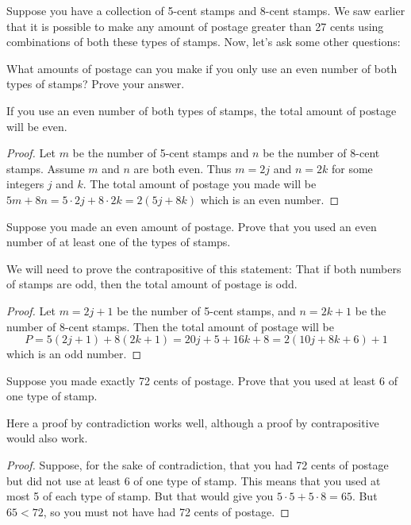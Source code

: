 \documentclass[11pt]{exam}
\begin{document}
Suppose you have a collection of 5-cent stamps and 8-cent stamps.  We saw earlier that it is possible to make any amount of postage greater than 27 cents using combinations of both these types of stamps.  Now, let's ask some other questions:
\begin{questions}
\question What amounts of postage can you make if you only use an even number of both types of stamps? Prove your answer.
\begin{solution}
If you use an even number of both types of stamps, the total amount of postage will be even.
\begin{proof}
Let $m$ be the number of 5-cent stamps and $n$ be the number of $8$-cent stamps.  Assume $m$ and $n$ are both even.  Thus $m = 2j$ and $n = 2k$ for some integers $j$ and $k$.  The total amount of postage you made will be $5m + 8n = 5\cdot 2j + 8\cdot 2k = 2(5j+8k)$ which is an even number.
\end{proof}
\end{solution}
\vfill
\question Suppose you made an even amount of postage.  Prove that you used an even number of at least one of the types of stamps.
\begin{solution}
We will need to prove the contrapositive of this statement: That if both numbers of stamps are odd, then the total amount of postage is odd.
\begin{proof}
Let $m = 2j+1$ be the number of 5-cent stamps, and $n = 2k+1$ be the number of 8-cent stamps.  Then the total amount of postage will be
\[P = 5(2j+1) + 8(2k+1) = 20j + 5 + 16k + 8 = 2(10j+8k+6) + 1\]
which is an odd number.
\end{proof}
\end{solution}
\vfill
\question Suppose you made exactly 72 cents of postage.  Prove that you used at least 6 of one type of stamp.
\begin{solution}
Here a proof by contradiction works well, although a proof by contrapositive would also work.

\begin{proof}
Suppose, for the sake of contradiction, that you had 72 cents of postage but did not use at least 6 of one type of stamp.  This means that you used at most 5 of each type of stamp.  But that would give you $5\cdot 5 + 5 \cdot 8 = 65$.  But $65 < 72$, so you must not have had 72 cents of postage.
\end{proof}
\end{solution}
\vfill
\end{questions}

\end{document}
